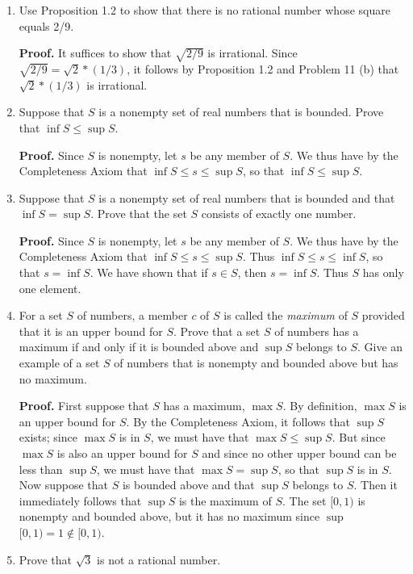 \begin{enumerate}
      
   \item[1.1.12]  Use Proposition 1.2 to show that there is no rational number 
                  whose square equals 2/9.
      
      \textbf{Proof.} It suffices to show that $\sqrt{2/9}$ is irrational. Since
      $\sqrt{2/9} = \sqrt{2} * (1/3)$, it follows by Proposition 1.2 and Problem
      11 (b) that $\sqrt{2} * (1/3)$ is irrational.
   \item[1.1.13]  Suppose that $S$ is a nonempty set of real numbers that is
                  bounded. Prove that $\inf S \le \sup S$.
              
      \textbf{Proof.} Since $S$ is nonempty, let $s$ be any member of $S$. We 
      thus have by the Completeness Axiom that $\inf S \le s \le \sup S$, so
      that $\inf S \le \sup S$.
   \item[1.1.14]  Suppose that $S$ is a nonempty set of real numbers that is 
                  bounded and that $\inf S = \sup S$. Prove that the set $S$ 
                  consists of exactly one number.
              
      \textbf{Proof.} Since $S$ is nonempty, let $s$ be any member of $S$. We 
      thus have by the Completeness Axiom that $\inf S \le s \le \sup S$. Thus
      $\inf S \le s \le \inf S$, so that $s = \inf S$. We have shown that if
      $s \in S$, then $s = \inf S$. Thus $S$ has only one element.
   \item[1.1.15]  For a set $S$ of numbers, a member $c$ of $S$ is called the
                  \textit{maximum} of $S$ provided that it is an upper bound for
                  $S$. Prove that a set $S$ of numbers has a maximum if and only
                  if it is bounded above and $\sup S$ belongs to $S$. Give an 
                  example of a set $S$ of numbers that is nonempty and bounded 
                  above but has no maximum.
              
      \textbf{Proof.} First suppose that $S$ has a maximum, $\max S$. By 
      definition, $\max S$ is an upper bound for $S$. By the Completeness Axiom,
      it follows that $\sup S$ exists; since $\max S$ is in $S$, we must have 
      that $\max S \le \sup S$. But since $\max S$ is also an upper bound for
      $S$ and since no other upper bound can be less than $\sup S$, we must have
      that $\max S = \sup S$, so that $\sup S$ is in $S$. Now suppose that $S$
      is bounded above and that $\sup S$ belongs to $S$. Then it immediately
      follows that $\sup S$ is the maximum of $S$. The set $[0, 1)$ is nonempty
      and bounded above, but it has no maximum since
      $\sup$ $[0, 1) = 1 \notin [0, 1)$.
   \item[1.1.16]  Prove that $\sqrt{3}$ is not a rational number.
              

\end{enumerate}
